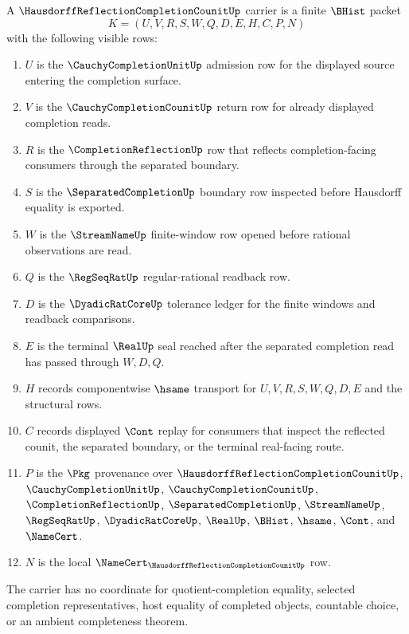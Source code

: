 \begin{definition}
\label{def:hausdorff-reflection-completion-counit-carrier}
A $\HausdorffReflectionCompletionCounitUp$ carrier is a finite $\BHist$ packet
$$
K=(U,V,R,S,W,Q,D,E,H,C,P,N)
$$
with the following visible rows:
\begin{enumerate}
\item $U$ is the $\CauchyCompletionUnitUp$ admission row for the displayed source entering the completion surface.
\item $V$ is the $\CauchyCompletionCounitUp$ return row for already displayed completion reads.
\item $R$ is the $\CompletionReflectionUp$ row that reflects completion-facing consumers through the separated boundary.
\item $S$ is the $\SeparatedCompletionUp$ boundary row inspected before Hausdorff equality is exported.
\item $W$ is the $\StreamNameUp$ finite-window row opened before rational observations are read.
\item $Q$ is the $\RegSeqRatUp$ regular-rational readback row.
\item $D$ is the $\DyadicRatCoreUp$ tolerance ledger for the finite windows and readback comparisons.
\item $E$ is the terminal $\RealUp$ seal reached after the separated completion read has passed through $W,D,Q$.
\item $H$ records componentwise $\hsame$ transport for $U,V,R,S,W,Q,D,E$ and the structural rows.
\item $C$ records displayed $\Cont$ replay for consumers that inspect the reflected counit, the separated boundary, or the terminal real-facing route.
\item $P$ is the $\Pkg$ provenance over $\HausdorffReflectionCompletionCounitUp$, $\CauchyCompletionUnitUp$, $\CauchyCompletionCounitUp$, $\CompletionReflectionUp$, $\SeparatedCompletionUp$, $\StreamNameUp$, $\RegSeqRatUp$, $\DyadicRatCoreUp$, $\RealUp$, $\BHist$, $\hsame$, $\Cont$, and $\NameCert$.
\item $N$ is the local $\NameCert_{\HausdorffReflectionCompletionCounitUp}$ row.
\end{enumerate}
The carrier has no coordinate for quotient-completion equality, selected completion representatives, host equality of completed objects, countable choice, or an ambient completeness theorem.
\end{definition}

